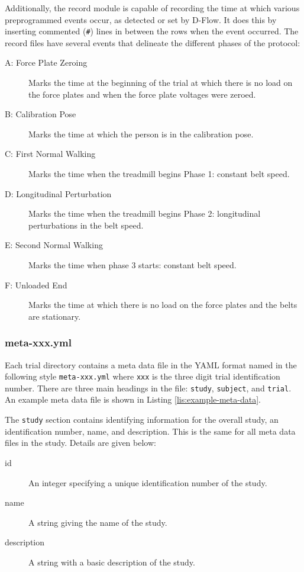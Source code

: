 \documentclass[fleqn,12pt]{wlpeerj}
\begin{document}
Additionally, the record module is capable of recording the time at which
various preprogrammed events occur, as detected or set by D-Flow. It does this
by inserting commented (\verb|#|) lines in between the rows when the event
occurred. The record files have several events that delineate the different
phases of the protocol:
%
\begin{description}
  \item[A: Force Plate Zeroing] Marks the time at the beginning of the trial at
    which there is no load on the force plates and when the force plate
    voltages were zeroed.
  \item[B: Calibration Pose] Marks the time at which the person is in the
    calibration pose.
  \item[C: First Normal Walking] Marks the time when the treadmill begins Phase
    1: constant belt speed.
  \item[D: Longitudinal Perturbation] Marks the time when the treadmill begins
    Phase 2: longitudinal perturbations in the belt speed.
  \item[E: Second Normal Walking] Marks the time when phase 3 starts: constant
    belt speed.
  \item[F: Unloaded End] Marks the time at which there is no load on the force
    plates and the belts are stationary.
\end{description}

\subsubsection*{meta-xxx.yml}

Each trial directory contains a meta data file in the YAML format named in the
following style \verb|meta-xxx.yml| where \verb|xxx| is the three digit trial
identification number. There are three main headings in the file: \verb+study+,
\verb+subject+, and \verb+trial+. An example meta data file is shown in Listing
\ref{lis:example-meta-data}.

The \verb+study+ section contains identifying information for the overall
study, an identification number, name, and description. This is the same for
all meta data files in the study. Details are given below:
%
\begin{description}
  \item[id] An integer specifying a unique identification number of the study.
  \item[name] A string giving the name of the study.
  \item[description] A string with a basic description of the study.
\end{description}
\end{document}

